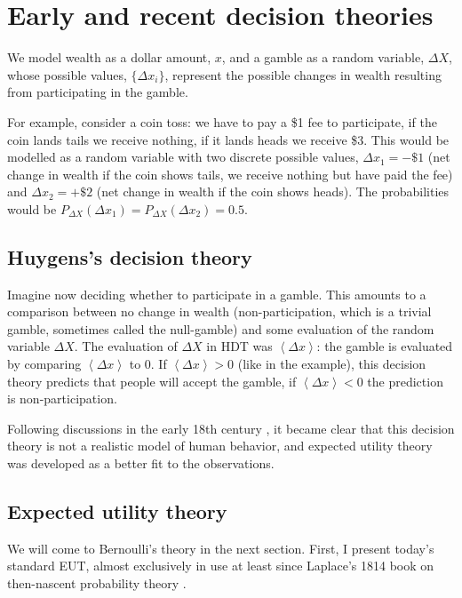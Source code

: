 \documentclass[pdftex]{article}
\newcommand{\ave}[1]{\left\langle#1 \right\rangle}
\newcommand{\seclabel}[1]{\label{section:#1}}
\newcommand{\Dx}{{\Delta x}}
\newcommand{\DX}{{\Delta X}}
\begin{document}
\section{Early and recent decision theories}
\seclabel{Early}
We model wealth as a dollar amount, $x$, and a gamble as a random variable, $\DX$, whose possible values, $\{\Dx_i\}$, represent the possible changes in wealth resulting from participating in the gamble. 

For example, consider a coin toss: we have to pay a \$1 fee to participate, if the coin lands tails we receive nothing, if it lands heads we receive \$3. This would be modelled as a random variable with two discrete possible values, $\Dx_1=-\$1$ (net change in wealth if the coin shows tails, we receive nothing but have paid the fee) and $\Dx_2=+\$2$ (net change in wealth if the coin shows heads). The probabilities would be $P_\DX(\Dx_1)=P_\DX(\Dx_2)=0.5$.


\subsection{Huygens's decision theory}
Imagine now deciding whether to participate in a gamble. This amounts to a comparison between no change in wealth (non-participation, which is a trivial gamble, sometimes called the null-gamble) and some evaluation of the random variable $\DX$. The evaluation of $\DX$ in HDT was $\ave{\Dx}$: the gamble is evaluated by comparing $\ave{\Dx}$ to 0. If $\ave{\Dx}>0$ (like in the example), this decision theory predicts that people will accept the gamble, if $\ave{\Dx}<0$ the prediction is non-participation.

Following discussions in the early 18th century \cite[p.~402]{Montmort1713}, it became clear that this decision theory is not a realistic model of human behavior, and expected utility theory was developed as a better fit to the observations. 

\subsection{Expected utility theory}
We will come to Bernoulli's theory in the next section. First, I present today's standard EUT, almost exclusively in use at least since Laplace's 1814 book on then-nascent probability theory \cite{Laplace1814}. 
\end{document}
